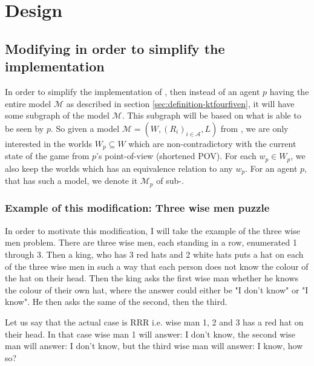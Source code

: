 \section{Design}

\newcommand{\POVModel}{\mathcal{M}}

\subsection{Modifying \SfiveN{} in order to simplify the implementation}
In order to simplify the implementation of \SfiveN{}, then instead of an agent $p$ having the entire model $\mathcal{M}$ as described in section \ref{sec:definition-ktfourfiven}, it will have some subgraph of the model $\mathcal{M}$. 
This subgraph will be based on what is able to be seen by $p$. 
So given a model $\mathcal{M} = (W,(R_i)_{i\in \mathcal{A}},L)$ from \SfiveN{}, we are only interested in the worlds $W_{p} \subseteq W$ which are non-contradictory with the current state of the game from $p$'s point-of-view (shortened POV). 
For each $w_p \in W_{p}$, we also keep the worlds which has an equivalence relation to any $w_p$.
For an agent $p$, that has such a model, we denote it $\mathcal{M}_p$ of sub-\SfiveN{}.

\subsubsection{Example of this modification: Three wise men puzzle}\label{sec:motivation}
In order to motivate this modification, I will take the example of the three wise men problem.
There are three wise men, each standing in a row, enumerated 1 through 3. 
Then a king, who has 3 red hats and 2 white hats puts a hat on each of the three wise men in such a way that each person does not know the colour of the hat on their head. 
Then the king asks the first wise man whether he knows the colour of their own hat, where the answer could either be "I don't know" or "I know". 
He then asks the same of the second, then the third.

Let us say that the actual case is RRR i.e. wise man 1, 2 and 3 has a red hat on their head.
In that case wise man 1 will answer: I don't know, the second wise man will answer: I don't know, but the third wise man will answer: I know, how so?



